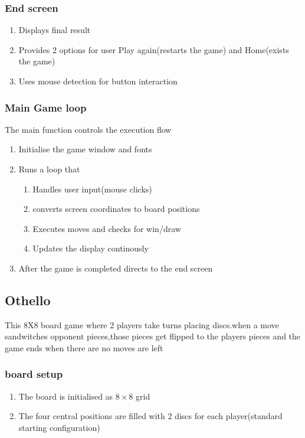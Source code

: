 \documentclass{article}
\begin{document}
\subsubsection{End screen}
\begin{enumerate}
    \item Displays final result
    \item Provides 2 options for user Play again(restarts the game) and Home(exists the game)
    \item Uses mouse detection for button interaction
\end{enumerate}
\subsubsection{Main Game loop}
The main function controls the execution flow
\begin{enumerate}
    \item Initialise the game window and fonts
    \item Runs a loop that \begin{enumerate}
        \item Handles user input(mouse clicks)
        \item converts screen coordinates to board positions
        \item Executes moves and checks for win/draw
        \item Updates the display continously
    \end{enumerate}
    \item After the game is completed directs to the end screen
\end{enumerate}
\subsection{Othello}
This 8X8 board game where 2 players take turns placing discs.when a move sandwitches opponent pieces,those pieces get flipped to the players pieces and the game ends when there are no moves are left
\subsubsection{board setup}
\begin{enumerate}
    \item The board is initialised as $8 \times 8$ grid
    \item The four central positions are filled with 2 discs for each player(standard starting configuration)
\end{enumerate}
\end{document}
